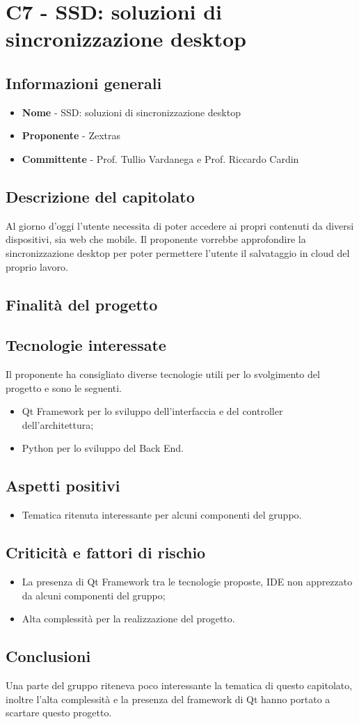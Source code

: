\chapter{C7 - SSD: soluzioni di sincronizzazione desktop}
\section{Informazioni generali}
\begin{itemize}
	\item \textbf{Nome} - SSD: soluzioni di sincronizzazione desktop
	\item \textbf{Proponente} - Zextras
	\item \textbf{Committente} - Prof. Tullio Vardanega e Prof. Riccardo Cardin
\end{itemize}
\section{Descrizione del capitolato}
Al giorno d'oggi l'utente necessita di poter accedere ai propri contenuti da diversi dispositivi, sia web che mobile. Il proponente vorrebbe approfondire la sincronizzazione desktop per poter permettere l'utente il salvataggio in cloud del proprio lavoro.
\section{Finalità del progetto}
\section{Tecnologie interessate}
Il proponente ha consigliato diverse tecnologie utili per lo svolgimento del progetto e sono le seguenti.
\begin{itemize}
	\item Qt Framework per lo sviluppo dell'interfaccia e del controller dell'architettura;
	\item Python per lo sviluppo del Back End.
\end{itemize}
\section{Aspetti positivi}
\begin{itemize}
	\item Tematica ritenuta interessante per alcuni componenti del gruppo.
\end{itemize}
\section{Criticità e fattori di rischio}
\begin{itemize}
	\item La presenza di Qt Framework tra le tecnologie proposte, IDE non apprezzato da alcuni componenti del gruppo;
	\item Alta complessità per la realizzazione del progetto.
\end{itemize}
\section{Conclusioni}
Una parte del gruppo riteneva poco interessante la tematica di questo capitolato, inoltre l'alta complessità e la presenza del framework di Qt hanno portato a scartare questo progetto.